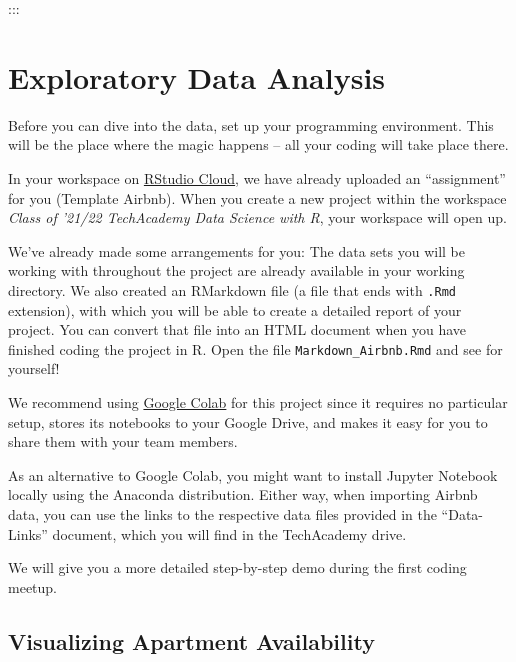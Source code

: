 \documentclass[
  11pt,
]{article}
\newenvironment{tips}[1]
  {
  \begin{itemize}
  \footnotesize
  \renewcommand{\labelitemi}{
    \raisebox{-.7\height}[0pt][0pt]{
      {\setkeys{Gin}{width=3em,keepaspectratio}
        \texttt{[image: images/\#1.png]}}
    }
  }
  \setlength{\fboxsep}{1em}
  \begin{rbox}
  \item
  }
  {
  \end{rbox}
  \end{itemize}
  }
\newenvironment{tipsp}[1]
  {
  \begin{itemize}
  \footnotesize
  \renewcommand{\labelitemi}{
    \raisebox{-.7\height}[0pt][0pt]{
      {\setkeys{Gin}{width=3em,keepaspectratio}
        \texttt{[image: images/\#1.png]}}
    }
  }
  \setlength{\fboxsep}{1em}
  \begin{pbox}
  \item
  }
  {
  \end{pbox}
  \end{itemize}
  }
\begin{document}
:::

\newpage

\hypertarget{exploratory-data-analysis}{%
\section{Exploratory Data Analysis}\label{exploratory-data-analysis}}

Before you can dive into the data, set up your programming environment.
This will be the place where the magic happens -- all your coding will take place there.

\begin{tips}r
In your workspace on \href{https://rstudio.cloud/projects}{RStudio Cloud}, we have already uploaded an ``assignment'' for you (Template Airbnb).
When you create a new project within the workspace \emph{Class of '21/22 \textbar{} TechAcademy \textbar{} Data Science with R}, your workspace will open up.

We've already made some arrangements for you: The data sets you will be working with throughout the project are already available in your working directory.
We also created an RMarkdown file (a file that ends with \texttt{.Rmd} extension), with which you will be able to create a detailed report of your project.
You can convert that file into an HTML document when you have finished coding the project in R.
Open the file \texttt{Markdown\_Airbnb.Rmd} and see for yourself!

\end{tips}

\begin{tipsp}p
We recommend using \href{https://colab.research.google.com}{Google Colab} for this project since it requires no particular setup, stores its notebooks to your Google Drive, and makes it easy for you to share them with your team members.

As an alternative to Google Colab, you might want to install Jupyter Notebook locally using the Anaconda distribution.
Either way, when importing Airbnb data, you can use the links to the respective data files provided in the ``Data-Links'' document, which you will find in the TechAcademy drive.

We will give you a more detailed step-by-step demo during the first coding meetup.


\end{tipsp}

\hypertarget{visualizing-apartment-availability}{%
\subsection{Visualizing Apartment Availability}\label{visualizing-apartment-availability}}
\end{document}
